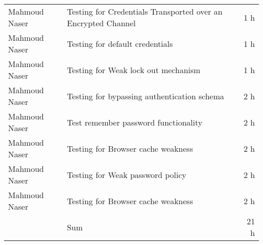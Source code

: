 \begin{table}[htpb]
\begin{tabularx}{\textwidth}{l X r}
      Mahmoud Naser & Testing for Credentials Transported over an Encrypted Channel & 1 h \\ %
      Mahmoud Naser & Testing for default credentials & 1 h \\ %
      Mahmoud Naser & Testing for Weak lock out mechanism & 1 h \\ %
      Mahmoud Naser & Testing for bypassing authentication schema & 2 h \\ %
      Mahmoud Naser & Test remember password functionality & 2 h \\ %
      Mahmoud Naser & Testing for Browser cache weakness & 2 h \\ %
      Mahmoud Naser & Testing for Weak password policy & 2 h \\ %
      Mahmoud Naser & Testing for Browser cache weakness & 2 h \\ %
      
      
      & Sum & 21 h \\
    \bottomrule
  \end{tabularx}
\end{table}
